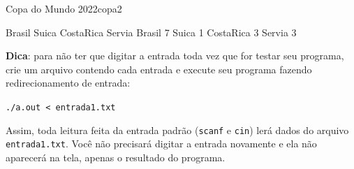 \documentclass[12pt,a4paper,oneside]{article}
\begin{document}
\begin{problem}{Copa do Mundo 2022}{copa}{2}
\begin{example}
{Brasil
Suica
CostaRica
Servia
}{
Brasil 7
Suica 1
CostaRica 3
Servia 3
}%
\end{example}

\textbf{Dica}: para não ter que digitar a entrada toda vez que for testar seu programa, crie um arquivo contendo cada entrada e execute seu programa fazendo redirecionamento de entrada:

\texttt{./a.out < entrada1.txt}

Assim, toda leitura feita da entrada padrão (\texttt{scanf} e \texttt{cin}) lerá dados do arquivo \texttt{entrada1.txt}. Você não precisará digitar a entrada novamente e ela não 
aparecerá na tela, apenas o resultado do programa.


\end{problem}
\end{document}
